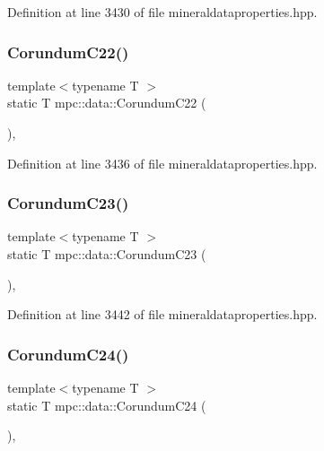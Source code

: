 Definition at line 3430 of file mineraldataproperties.\+hpp.

\mbox{\label{namespacempc_1_1data_a66e512e49dfa1aa7f95c2073491352bf}} 
\subsubsection{\texorpdfstring{Corundum\+C22()}{CorundumC22()}}
{\footnotesize\ttfamily template$<$typename T $>$ \\
static T mpc\+::data\+::\+Corundum\+C22 (\begin{DoxyParamCaption}{ }\end{DoxyParamCaption})\hspace{0.3cm}{\ttfamily [inline]}, {\ttfamily [static]}}



Definition at line 3436 of file mineraldataproperties.\+hpp.

\mbox{\label{namespacempc_1_1data_a04ee3c933c108c08e9d6dfd36d41538d}} 
\subsubsection{\texorpdfstring{Corundum\+C23()}{CorundumC23()}}
{\footnotesize\ttfamily template$<$typename T $>$ \\
static T mpc\+::data\+::\+Corundum\+C23 (\begin{DoxyParamCaption}{ }\end{DoxyParamCaption})\hspace{0.3cm}{\ttfamily [inline]}, {\ttfamily [static]}}



Definition at line 3442 of file mineraldataproperties.\+hpp.

\mbox{\label{namespacempc_1_1data_a6a0486ab291bd5177742e50782fa437d}} 
\subsubsection{\texorpdfstring{Corundum\+C24()}{CorundumC24()}}
{\footnotesize\ttfamily template$<$typename T $>$ \\
static T mpc\+::data\+::\+Corundum\+C24 (\begin{DoxyParamCaption}{ }\end{DoxyParamCaption})\hspace{0.3cm}{\ttfamily [inline]}, {\ttfamily [static]}}



